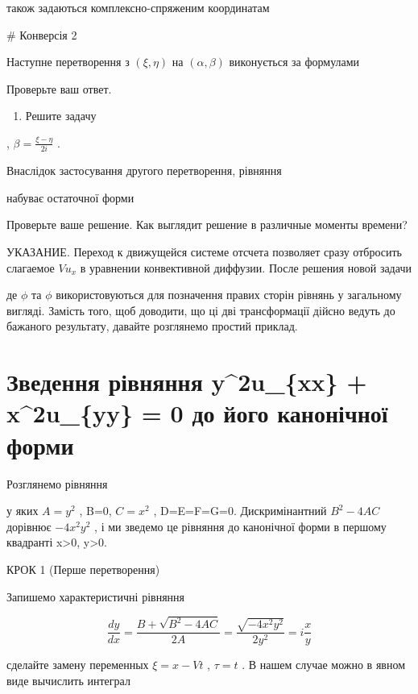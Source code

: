 \documentclass[
  ukrainian,
]{article}
\providecommand{\tightlist}{%
  \setlength{\itemsep}{0pt}\setlength{\parskip}{0pt}}
\begin{document}
також задаються комплексно-спряженим координатам

\# Конверсія 2

Наступне перетворення з \((\xi,\eta)\) на \((\alpha,\beta)\) виконується
за формулами

Проверьте ваш ответ.

\begin{enumerate}
\def\labelenumi{\arabic{enumi}.}
\setcounter{enumi}{3}
\tightlist
\item
  Решите задачу
\end{enumerate}

, \(\beta = \frac{\xi - \eta}{2i}\) .

Внаслідок застосування другого перетворення, рівняння

набуває остаточної форми

Проверьте ваше решение. Как выглядит решение в различные моменты
времени?

УКАЗАНИЕ. Переход к движущейся системе отсчета позволяет сразу отбросить
слагаемое \(Vu_x\) в уравнении конвективной диффузии. После решения
новой задачи

де \(\phi\) та \(\phi\) використовуються для позначення правих сторін
рівнянь у загальному вигляді. Замість того, щоб доводити, що ці дві
трансформації дійсно ведуть до бажаного результату, давайте розглянемо
простий приклад.

\section{Зведення рівняння y\^{}2u\_\{xx\} + x\^{}2u\_\{yy\} = 0 до його
канонічної
форми}\label{ux437ux432ux435ux434ux435ux43dux43dux44f-ux440ux456ux432ux43dux44fux43dux43dux44f-y2u_xx-x2u_yy-0-ux434ux43e-ux439ux43eux433ux43e-ux43aux430ux43dux43eux43dux456ux447ux43dux43eux457-ux444ux43eux440ux43cux438}

Розглянемо рівняння

у яких \(A=y^2\) , B=0, \(C=x^2\) , D=E=F=G=0. Дискримінантний
\(B^2-4AC\) дорівнює \(-4x^2y^2\) , і ми зведемо це рівняння до
канонічної форми в першому квадранті x\textgreater0, y\textgreater0.

КРОК 1 (Перше перетворення)

Запишемо характеристичні рівняння

\[
\frac{dy}{dx} = \frac{B + \sqrt{B^2 - 4AC}}{2A} = \frac{\sqrt{-4x^2y^2}}{2y^2} = i\frac{x}{y}
\]

сделайте замену переменных \(\xi = x - Vt\) , \(\tau = t\) . В нашем
случае можно в явном виде вычислить интеграл
\end{document}
